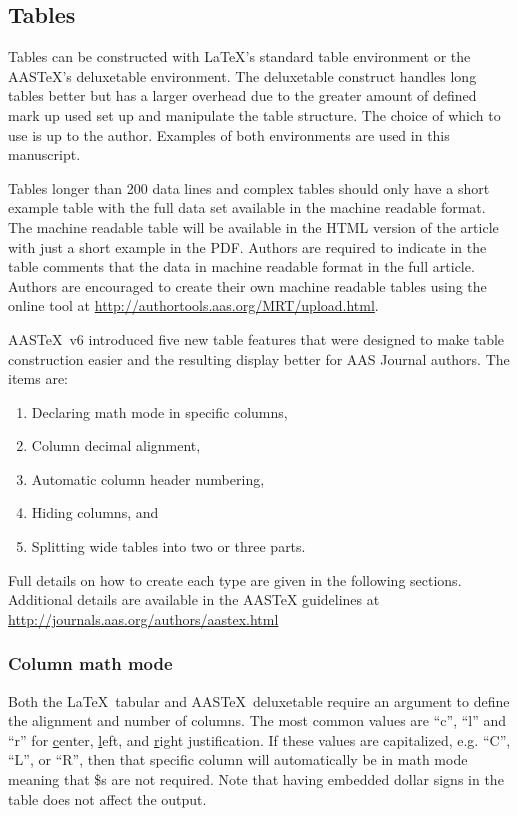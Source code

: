 \documentclass[linenumbers]{aastex631}
\newcommand\aastex{AAS\TeX}
\newcommand\latex{La\TeX}
\begin{document}
\subsection{Tables} \label{subsec:tables}

Tables can be constructed with \latex's standard table environment or the
\aastex's deluxetable environment. The deluxetable construct handles long
tables better but has a larger overhead due to the greater amount of
defined mark up used set up and manipulate the table structure.  The choice
of which to use is up to the author.  Examples of both environments are
used in this manuscript. 

Tables longer than 200 data lines and complex tables should only have a
short example table with the full data set available in the machine
readable format.  The machine readable table will be available in the HTML
version of the article with just a short example in the PDF. Authors are
required to indicate in the table comments that the data in machine 
readable format in the full article.
Authors are encouraged to create their own machine
readable tables using the online tool at
\url{http://authortools.aas.org/MRT/upload.html}.

\aastex\ v6 introduced five new table features that were designed to make
table construction easier and the resulting display better for AAS Journal
authors.  The items are:

\begin{enumerate}
\item Declaring math mode in specific columns,
\item Column decimal alignment, 
\item Automatic column header numbering,
\item Hiding columns, and
\item Splitting wide tables into two or three parts.
\end{enumerate}

Full details on how to create each type are given in the following 
sections. Additional details are available in the AASTeX
guidelines at \url{http://journals.aas.org/authors/aastex.html}

\subsubsection{Column math mode}

Both the \latex\ tabular and \aastex\ deluxetable require an argument to
define the alignment and number of columns.  The most common values are
``c'', ``l'' and ``r'' for \underline{c}enter, \underline{l}eft, and
\underline{r}ight justification.  If these values are capitalized, e.g.
``C'', ``L'', or ``R'', then that specific column will automatically be in math
mode meaning that \$s are not required.  Note that having embedded dollar
signs in the table does not affect the output. 
\end{document}
